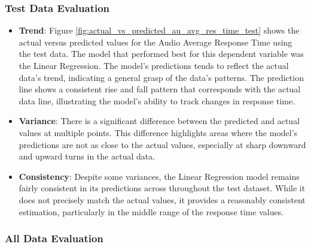 \subsubsection*{Test Data Evaluation}

\begin{itemize}
    \item \textbf{Trend}: Figure \ref{fig:actual_vs_predicted_au_avg_res_time_test} shows the actual versus predicted values for the Audio Average Response Time using the test data. The model that performed
          best for this dependent variable was the Linear Regression. The model's predictions tends to reflect the actual data's trend, indicating a general grasp of the data's patterns. The prediction line shows
          a consistent rise and fall pattern that corresponds with the actual data line, illustrating the model's ability to track changes in response time.

    \item \textbf{Variance}: There is a significant difference between the predicted and actual values at multiple points. This difference highlights areas where the model's predictions 
            are not as close to the actual values, especially at sharp downward and upward turns in the actual data.

    \item \textbf{Consistency}: Despite some variances, the Linear Regression model remains fairly consistent in its predictions across throughout the test dataset. While it does not precisely match the actual values, it provides
          a reasonably consistent estimation, particularly in the middle range of the response time values.

\end{itemize}


\subsubsection*{All Data Evaluation}

